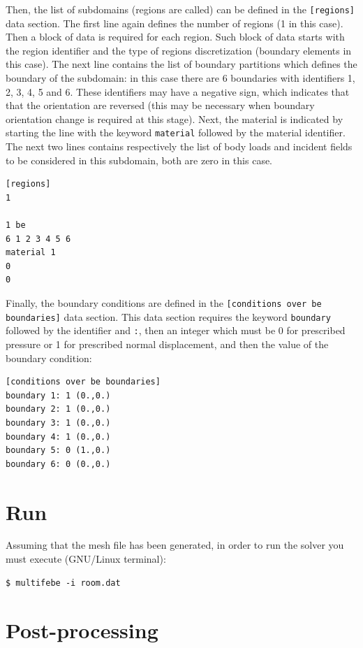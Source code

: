 \documentclass[a4]{article}
\begin{document}
Then, the list of subdomains (regions are called) can be defined in the \texttt{[regions]} data section. The first line again defines the number of regions (1 in this case). Then  a block of data is required for each region. Such block of data starts with the region identifier and the type of regions discretization (boundary elements in this case). The next line contains the list of boundary partitions which defines the boundary of the subdomain: in this case there are 6 boundaries with identifiers 1, 2, 3, 4, 5 and 6. These identifiers may have a negative sign, which indicates that that the orientation are reversed (this may be necessary when boundary orientation change is required at this stage). Next, the material is indicated by starting the line with the keyword \texttt{material} followed by the material identifier. The next two lines contains respectively the list of body loads and incident fields to be considered in this subdomain, both are zero in this case.
\begin{Verbatim}[frame=single, fontsize=\small, label=room.dat]
[regions]
1

1 be 
6 1 2 3 4 5 6
material 1
0
0
\end{Verbatim}

Finally, the boundary conditions are defined in the \texttt{[conditions over be boundaries]} data section. This data section requires the keyword \texttt{boundary} followed by the identifier and \texttt{:}, then an integer which must be 0 for prescribed pressure or 1 for prescribed normal displacement, and then the value of the boundary condition:
\begin{Verbatim}[frame=single, fontsize=\small, label=room.dat]
[conditions over be boundaries]
boundary 1: 1 (0.,0.)
boundary 2: 1 (0.,0.)
boundary 3: 1 (0.,0.)
boundary 4: 1 (0.,0.)
boundary 5: 0 (1.,0.)
boundary 6: 0 (0.,0.)
\end{Verbatim}

\section{Run}

Assuming that the mesh file has been generated, in order to run the solver you must execute (GNU/Linux terminal):
\begin{Verbatim}[frame=single, fontsize=\small, label=command line]
$ multifebe -i room.dat
\end{Verbatim}


\section{Post-processing}
\end{document}
